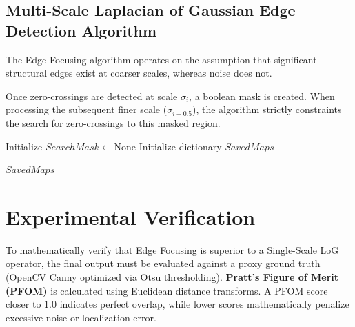 \documentclass[11pt, letterpaper]{article}
\begin{document}
\subsection{Multi-Scale Laplacian of Gaussian Edge Detection Algorithm}
The Edge Focusing algorithm operates on the assumption that significant structural edges exist at coarser scales, whereas noise does not. 

Once zero-crossings are detected at scale $\sigma_i$, a boolean mask is created. When processing the subsequent finer scale ($\sigma_{i-0.5}$), the algorithm strictly constraints the search for zero-crossings to this masked region.


\begin{algorithm}[H]
\DontPrintSemicolon
{}


Initialize $SearchMask \leftarrow \text{None}$\;
Initialize dictionary $SavedMaps$\;


\Return $SavedMaps$\;
\caption{Multi-Scale Edge Detection using Laplacian of Gaussian}
\end{algorithm}

\section{Experimental Verification}
To mathematically verify that Edge Focusing is superior to a Single-Scale LoG operator, the final output must be evaluated against a proxy ground truth (OpenCV Canny optimized via Otsu thresholding). \textbf{Pratt's Figure of Merit (PFOM)} is calculated using Euclidean distance transforms. A PFOM score closer to $1.0$ indicates perfect overlap, while lower scores mathematically penalize excessive noise or localization error. 
\end{document}
